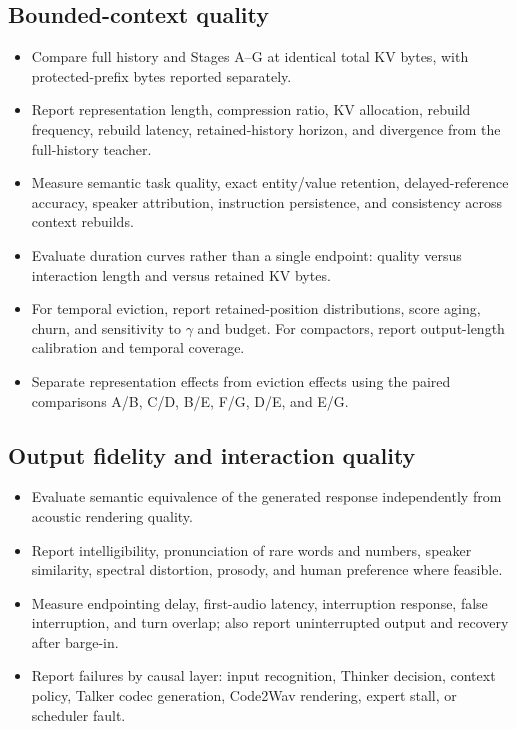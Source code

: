 \documentclass[10pt,letterpaper]{article}
\begin{document}
\subsection{Bounded-context quality}
\begin{itemize}
    \item Compare full history and Stages A--G at identical total KV bytes, with protected-prefix bytes reported separately.
    \item Report representation length, compression ratio, KV allocation, rebuild frequency, rebuild latency, retained-history horizon, and divergence from the full-history teacher.
    \item Measure semantic task quality, exact entity/value retention, delayed-reference accuracy, speaker attribution, instruction persistence, and consistency across context rebuilds.
    \item Evaluate duration curves rather than a single endpoint: quality versus interaction length and versus retained KV bytes.
    \item For temporal eviction, report retained-position distributions, score aging, churn, and sensitivity to $\gamma$ and budget. For compactors, report output-length calibration and temporal coverage.
    \item Separate representation effects from eviction effects using the paired comparisons A/B, C/D, B/E, F/G, D/E, and E/G.
\end{itemize}

\subsection{Output fidelity and interaction quality}
\begin{itemize}
    \item Evaluate semantic equivalence of the generated response independently from acoustic rendering quality.
    \item Report intelligibility, pronunciation of rare words and numbers, speaker similarity, spectral distortion, prosody, and human preference where feasible.
    \newpage
    \item Measure endpointing delay, first-audio latency, interruption response, false interruption, and turn overlap; also report uninterrupted output and recovery after barge-in.
    \item Report failures by causal layer: input recognition, Thinker decision, context policy, Talker codec generation, Code2Wav rendering, expert stall, or scheduler fault.
\end{itemize}
\end{document}
